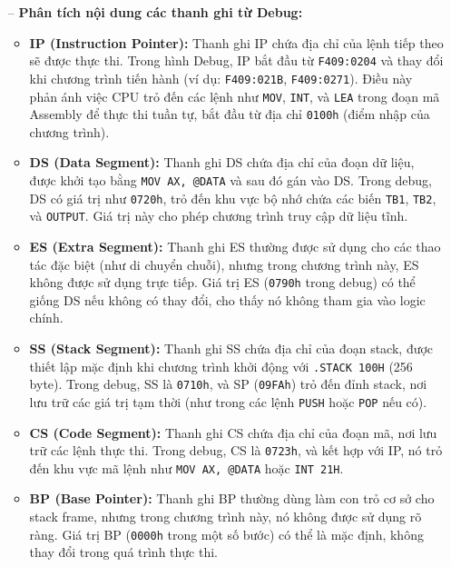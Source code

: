 \documentclass{article}
\begin{document}
\begin{itemize}
    \item[--] \textbf{Phân tích nội dung các thanh ghi từ Debug:}
    \begin{itemize}[label=$+$]
        \item \textbf{IP (Instruction Pointer):} Thanh ghi IP chứa địa chỉ của lệnh tiếp theo sẽ được thực thi. Trong hình Debug, IP bắt đầu từ \texttt{F409:0204} và thay đổi khi chương trình tiến hành (ví dụ: \texttt{F409:021B}, \texttt{F409:0271}). Điều này phản ánh việc CPU trỏ đến các lệnh như \texttt{MOV}, \texttt{INT}, và \texttt{LEA} trong đoạn mã Assembly để thực thi tuần tự, bắt đầu từ địa chỉ \texttt{0100h} (điểm nhập của chương trình).

        \item \textbf{DS (Data Segment):} Thanh ghi DS chứa địa chỉ của đoạn dữ liệu, được khởi tạo bằng \texttt{MOV AX, @DATA} và sau đó gán vào DS. Trong debug, DS có giá trị như \texttt{0720h}, trỏ đến khu vực bộ nhớ chứa các biến \texttt{TB1}, \texttt{TB2}, và \texttt{OUTPUT}. Giá trị này cho phép chương trình truy cập dữ liệu tĩnh.

        \item \textbf{ES (Extra Segment):} Thanh ghi ES thường được sử dụng cho các thao tác đặc biệt (như di chuyển chuỗi), nhưng trong chương trình này, ES không được sử dụng trực tiếp. Giá trị ES (\texttt{0790h} trong debug) có thể giống DS nếu không có thay đổi, cho thấy nó không tham gia vào logic chính.

        \item \textbf{SS (Stack Segment):} Thanh ghi SS chứa địa chỉ của đoạn stack, được thiết lập mặc định khi chương trình khởi động với \texttt{.STACK 100H} (256 byte). Trong debug, SS là \texttt{0710h}, và SP (\texttt{09FAh}) trỏ đến đỉnh stack, nơi lưu trữ các giá trị tạm thời (như trong các lệnh \texttt{PUSH} hoặc \texttt{POP} nếu có).

        \item \textbf{CS (Code Segment):} Thanh ghi CS chứa địa chỉ của đoạn mã, nơi lưu trữ các lệnh thực thi. Trong debug, CS là \texttt{0723h}, và kết hợp với IP, nó trỏ đến khu vực mã lệnh như \texttt{MOV AX, @DATA} hoặc \texttt{INT 21H}.

        \item \textbf{BP (Base Pointer):} Thanh ghi BP thường dùng làm con trỏ cơ sở cho stack frame, nhưng trong chương trình này, nó không được sử dụng rõ ràng. Giá trị BP (\texttt{0000h} trong một số bước) có thể là mặc định, không thay đổi trong quá trình thực thi.


\end{itemize}
\end{itemize}
\end{document}
